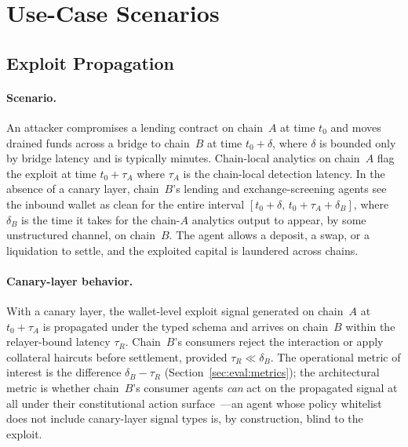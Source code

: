 \documentclass[journal]{IEEEtran}
\begin{document}
\section{Use-Case Scenarios}\label{sec:uc}

\subsection{Exploit Propagation}\label{sec:uc:exploit}

\paragraph*{Scenario.}
An attacker compromises a lending contract on chain~$A$ at time
$t_0$ and moves drained funds across a bridge to chain~$B$ at time
$t_0 + \delta$, where $\delta$ is bounded only by bridge latency and is
typically minutes. Chain-local analytics on chain~$A$ flag the exploit
at time $t_0 + \tau_A$ where $\tau_A$ is the chain-local detection
latency. In the absence of a canary layer, chain~$B$'s lending and
exchange-screening agents see the inbound wallet as clean for the
entire interval $[t_0+\delta,\,t_0+\tau_A+\delta_{B}]$, where
$\delta_{B}$ is the time it takes for the chain-$A$ analytics output to
appear, by some unstructured channel, on chain~$B$. The agent allows a
deposit, a swap, or a liquidation to settle, and the exploited capital
is laundered across chains.

\paragraph*{Canary-layer behavior.}
With a canary layer, the wallet-level exploit signal generated on
chain~$A$ at $t_0+\tau_A$ is propagated under the typed schema and
arrives on chain~$B$ within the relayer-bound latency $\tau_R$.
Chain~$B$'s consumers reject the interaction or apply collateral
haircuts before settlement, provided $\tau_R \ll \delta_B$. The
operational metric of interest is the difference $\delta_B - \tau_R$
(Section~\ref{sec:eval:metrics}); the architectural metric is whether
chain~$B$'s consumer agents \emph{can} act on the propagated signal at
all under their constitutional action
surface~\cite{bai2022constitutional}---an agent whose policy whitelist
does not include canary-layer signal types is, by construction, blind
to the exploit.
\end{document}
